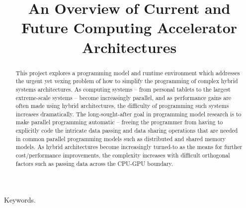 \documentclass[conference]{IEEEtran}
\begin{document}
%
\title{An Overview of Current and Future Computing Accelerator Architectures}


\author{
}


\maketitle

\begin{abstract}
This project explores a programming model and runtime environment which addresses the urgent yet vexing problem of how to simplify the programming of complex hybrid systems architectures. As computing systems – from personal tablets to the largest extreme-scale systems – become increasingly parallel, and as performance gains are often made using hybrid architectures, the difficulty of programming such systems increases dramatically. The long-sought-after goal in programming model research is to make parallel programming automatic – freeing the programmer from having to explicitly code the intricate data passing and data sharing operations that are needed in common parallel programming models such as distributed and shared memory models. As hybrid architectures become increasingly turned-to as the means for further cost/performance improvements, the complexity increases with difficult orthogonal factors such as passing data across the CPU-GPU boundary.
\end{abstract}

\begin{IEEEkeywords}
Keywords.
\end{IEEEkeywords}

\IEEEpeerreviewmaketitle
\end{document}
